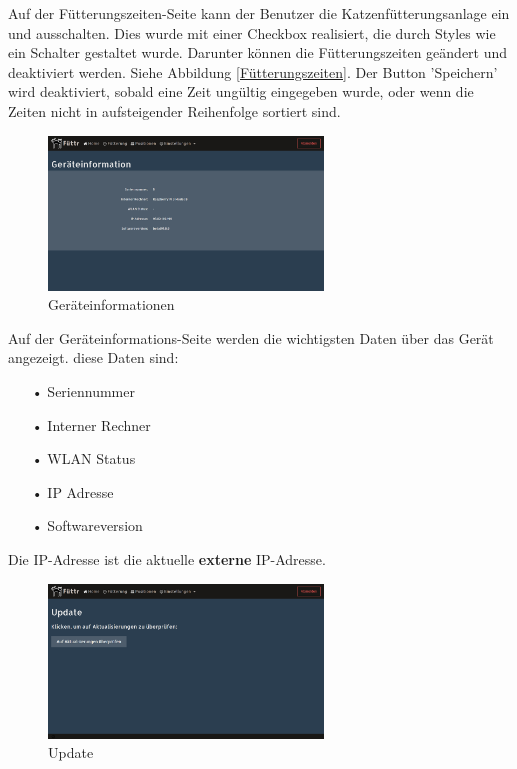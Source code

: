 Auf der Fütterungszeiten-Seite kann der Benutzer die Katzenfütterungsanlage ein und ausschalten. Dies wurde mit einer Checkbox realisiert, die durch Styles wie ein Schalter gestaltet wurde. Darunter können die Fütterungszeiten geändert und deaktiviert werden. Siehe Abbildung \ref{Fütterungszeiten}. Der Button 'Speichern' wird deaktiviert, sobald eine Zeit ungültig eingegeben wurde, oder wenn die Zeiten nicht in aufsteigender Reihenfolge sortiert sind. \newpage

\begin{figure}
\vspace{-10pt}
  \begin{center}
    \includegraphics[width=0.65\textwidth]{Bilder/Greistorfer/Gerateinformation}
  \end{center}
  \caption{Geräteinformationen}
  \label{Geräteinformationen}
  \vspace{-60pt}
\end{figure}

Auf der Geräteinformations-Seite werden die wichtigsten Daten über das Gerät angezeigt. diese Daten sind:
\begin{itemize}
\item[•]Seriennummer
\item[•]Interner Rechner
\item[•]WLAN Status
\item[•]IP Adresse
\item[•]Softwareversion
\end{itemize}
Die IP-Adresse ist die aktuelle \textbf{externe} IP-Adresse. \\

\begin{figure}
\vspace{-10pt}
  \begin{center}
    \includegraphics[width=0.65\textwidth]{Bilder/Greistorfer/Update}
  \end{center}
  \caption{Update}
  \label{Update}
  \vspace{-10pt}
\end{figure}

